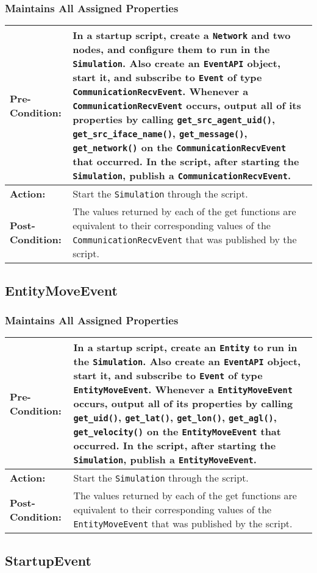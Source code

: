 \documentclass[titlepage]{article}
\newcommand{\testcase}[3]{
    \begin{center}
    \begin{tabular}{| l | p{0.7\textwidth}|}
        \hline
        \rowcolor[gray]{0.8}\textbf{Pre-Condition:} & #1 \\ \hline
        \textbf{Action:} & #2 \\ \hline
        \rowcolor[gray]{0.8}\textbf{Post-Condition:} & #3 \\ \hline
    \end{tabular}
    \end{center}
}
\begin{document}
\subsubsection{Maintains All Assigned Properties}
\testcase{In a startup script, create a \texttt{Network} and two nodes, and configure them to run in the \texttt{Simulation}. Also create an \texttt{EventAPI} object, start it, and subscribe to \texttt{Event} of type \texttt{CommunicationRecvEvent}. Whenever a \texttt{CommunicationRecvEvent} occurs, output all of its properties by calling \texttt{get\_src\_agent\_uid()}, \texttt{get\_src\_iface\_name()}, \texttt{get\_message()}, \texttt{get\_network()} on the \texttt{CommunicationRecvEvent} that occurred. In the script, after starting the \texttt{Simulation}, publish a \texttt{CommunicationRecvEvent}.}{Start the \texttt{Simulation} through the script.}{The values returned by each of the get functions are equivalent to their corresponding values of the \texttt{CommunicationRecvEvent} that was published by the script.}

\subsection{EntityMoveEvent}
\subsubsection{Maintains All Assigned Properties}
\testcase{In a startup script, create an \texttt{Entity} to run in the \texttt{Simulation}. Also create an \texttt{EventAPI} object, start it, and subscribe to \texttt{Event} of type \texttt{EntityMoveEvent}. Whenever a \texttt{EntityMoveEvent} occurs, output all of its properties by calling \texttt{get\_uid()}, \texttt{get\_lat()}, \texttt{get\_lon()}, \texttt{get\_agl()}, \texttt{get\_velocity()} on the \texttt{EntityMoveEvent} that occurred. In the script, after starting the \texttt{Simulation}, publish a \texttt{EntityMoveEvent}.}{Start the \texttt{Simulation} through the script.}{The values returned by each of the get functions are equivalent to their corresponding values of the \texttt{EntityMoveEvent} that was published by the script.}

\subsection{StartupEvent}
\end{document}
